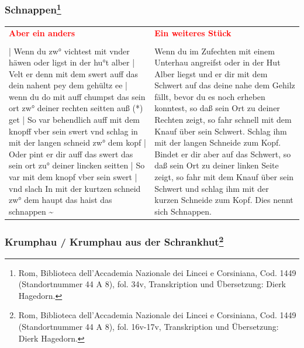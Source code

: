 \newpage

\subsubsection[Schnappen]{Schnappen\footnote{\hspace*{0.5ex}Rom, Biblioteca dell'Accademia Nazionale dei Lincei e Corsiniana, Cod. 1449 (Standortnummer 44 A 8), fol. 34v, Transkription und Übersetzung: Dierk Hagedorn.}}

\begin{longtable}{p{6.25cm}p{6.25cm}}
\textbf{\textcolor{red}{Aber ein anders}}
&
\textbf{\textcolor{red}{Ein weiteres Stück}}
\\
\\
| Wenn du zw° vichtest mit vnder häwen oder ligst in der hu°t alber | Velt er denn mit dem swert auff das dein nahent pey dem gehültz ee | wenn du do mit auff chumpst das sein ort zw° deiner rechten seitten auß (*) get | So var behendlich auff mit dem knopff vber sein swert vnd schlag in mit der langen schneid zw° dem kopf | Oder pint er dir auff das swert das sein ort zu° deiner lincken seitten | So var mit dem knopf vber sein swert | vnd slach In mit der kurtzen schneid zw° dem haupt das haist das schnappen \textasciitilde 
&
Wenn du im Zufechten mit einem Unterhau angreifst oder in der Hut Alber liegst und er dir mit dem Schwert auf das deine nahe dem Gehilz fällt, bevor du es noch erheben konntest, so daß sein Ort zu deiner Rechten zeigt, so fahr schnell mit dem Knauf über sein Schwert. Schlag ihm mit der langen Schneide zum Kopf. Bindet er dir aber auf das Schwert, so daß sein Ort zu deiner linken Seite zeigt, so fahr mit dem Knauf über sein Schwert und schlag ihm mit der kurzen Schneide zum Kopf.
Dies nennt sich Schnappen.
\end{longtable}

\newpage

\begin{center}
\end{center}
\newpage

\subsubsection[Krumphau / Krumphau aus der Schrankhut]{Krumphau / Krumphau aus der Schrankhut\footnote{\hspace*{0.5ex}Rom, Biblioteca dell'Accademia Nazionale dei Lincei e Corsiniana, Cod. 1449 (Standortnummer 44 A 8), fol. 16v-17v, Transkription und Übersetzung: Dierk Hagedorn.}}

